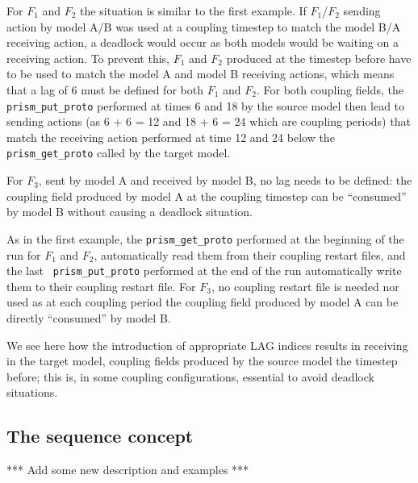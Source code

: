 \begin{enumerate}
  For $F_1$ and $F_2$ the situation is similar to the first
  example. If $F_1$/$F_2$ sending action by model A/B was used at a
  coupling timestep to match the model B/A receiving action, a
  deadlock would occur as both models would be waiting on a receiving
  action. To prevent this, $F_1$ and $F_2$ produced at the timestep
  before have to be used to match the model A and model B receiving
  actions, which means that a lag of 6 must be defined for both $F_1$
  and $F_2$. For both coupling fields, the {\tt prism\_put\_proto}
  performed at times 6 and 18 by the source model then lead to sending
  actions (as 6 + 6 = 12 and 18 + 6 = 24 which are coupling periods)
  that match the receiving action performed at time 12 and 24 below
  the {\tt prism\_get\_proto} called by the target model.

  For $F_3$, sent by model A and received by model B, no lag
  needs to be defined: the coupling field produced by model A at the
  coupling timestep can be ``consumed'' by model B without causing a
  deadlock situation.

  As in the first example, the {\tt prism\_get\_proto} performed at
  the beginning of the run for $F_1$ and $F_2$, automatically read
  them from their coupling restart files, and the last {\tt
  prism\_put\_proto} performed at the end of the run automatically
  write them to their coupling restart file. For $F_3$, no coupling
  restart file is needed nor used as at each coupling period the
  coupling field produced by model A can be directly ``consumed'' by
  model B.

  We see here how the introduction of appropriate LAG indices results in
  receiving in the target model,
  coupling fields produced by the
  source model the timestep before; this is, in some coupling
  configurations, essential to avoid deadlock situations.

  \end{enumerate}

\subsection{The sequence concept}

*** Add some new description and examples ***
 
